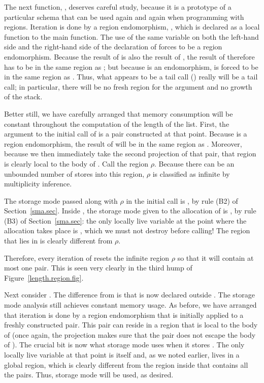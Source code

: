 \documentclass[12pt]{book}
\begin{document}
The next function, , deserves careful study, because it
is a prototype of a particular schema that can be used again and again
when programming with regions. Iteration is done by a
%
%
%
region endomorphism, , which is declared as a local function to the
main function. The use of the same variable  on both the left-hand side
and the right-hand side of the declaration of  forces  to be a
region endomorphism. Because the result of  is also the
result of , the result of  therefore has to be in
the same region as ; but because  is an endomorphism,  is forced to be in the same region as .  Thus, what appears to
be a tail call () really will be a tail call; in particular,
there will be no fresh region for the argument and no growth of the stack.

Better still, we have carefully arranged that memory consumption will be
constant throughout the computation of the length of the list.  First, the
argument to the initial call of  is a pair  constructed at
that point. Because  is a region endomorphism, the result of
 will be in the same region as .  Moreover, because we
then immediately take the second projection of that pair, that region is clearly
local to the body of .  Call the region $\rho$. Because there can be
an unbounded number of stores into this region, $\rho$ is classified as infinite
by multiplicity inference.

The storage mode passed along with $\rho$ in the initial call  is
, by rule (B2) of Section~\ref{sma.sec}. Inside , the storage
mode given to the allocation of  is , by rule (B3) of
Section~\ref{sma.sec}: the only locally live variable at the point where the
allocation takes place is , which we must not destroy before calling!
The region that  lies in is clearly different from $\rho$.

Therefore, every iteration of  resets the infinite region $\rho$ so
that it will contain at most one pair.  This is seen very clearly in the third
hump of Figure~\ref{length.region.fig}.

Next consider . The difference from  is that
 is now declared outside .  The storage mode analysis
still achieves constant memory usage. As before, we have arranged that iteration
is done by a region endomorphism that is initially applied to a freshly
constructed pair. This pair can reside in a region that is local to the body of
 (once again, the projection  makes sure
that the pair does not escape the body of ).  The crucial bit is now
what storage mode  uses when it stores .  The only
locally live variable at that point is  itself and, as we noted
earlier,  lives in a global region, which is clearly different from
the region inside  that contains all the pairs.  Thus, storage mode
 will be used, as desired.
\end{document}
